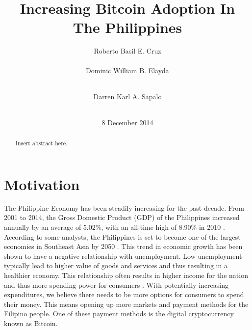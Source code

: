 \documentclass{acm_proc_article-sp}
\begin{document}
\title{Increasing Bitcoin Adoption In The Philippines}

\author{
\alignauthor
Roberto Basil E. Cruz\\
       \\
\alignauthor
\alignauthor Dominic William B. Elayda\\
       \\
\and
\alignauthor
Darren Karl A. Sapalo\\
       \\
}
\date{8 December 2014}

\maketitle
\begin{abstract}

Insert abstract here.

\end{abstract}



\section{Motivation}

The Philippine Economy has been steadily increasing for the past decade. From 2001 to 2014, the Gross Domestic Product (GDP) of the Philippines increased annually by an average of 5.02\%, with an all-time high of 8.90\% in 2010 \cite{TradingEconomics:11272014}. According to some analysts, the Philippines is set to become one of the largest economies in Southeast Asia by 2050 \cite{HSBC:01112012}. This trend in economic growth has been shown to have a negative relationship with unemployment. Low unemployment typically lead to higher value of goods and services and thus resulting in a healthier economy. This relationship often results in higher income for the nation and thus more spending power for consumers \cite{EconomicGrowth:01072013}. With potentially increasing expenditures, we believe there needs to be more options for consumers to spend their money. This means opening up more markets and payment methods for the Filipino people. One of these payment methods is the digital cryptocurrency known as Bitcoin.
\end{document}
